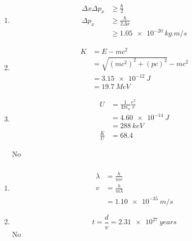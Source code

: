 \documentclass{article}
\begin{document}
\begin{enumerate}
  \item

        \begin{align*}
          \Delta x \Delta p_x & \ge \frac{\hbar}{2}          \\
          \Delta p_x          & \ge \frac{\hbar}{2 \Delta x} \\
                              & \ge \qty{1.05e-20}{kg.m/s}
        \end{align*}

  \item

        \begin{align*}
          K & = E - m c^2                          \\
            & = \sqrt{(m c^2)^2 + (p c)^2} - m c^2 \\
            & = \qty{3.15e-12}{J}                  \\
            & = \qty{19.7}{MeV}
        \end{align*}

  \item

        \begin{align*}
          U           & = \frac{1}{4 \pi \epsilon_0} \frac{e^2}{r} \\
                      & = \qty{4.60e-14}{J}                        \\
                      & = \qty{288}{keV}                           \\
          \frac{K}{U} & = 68.4
        \end{align*}

        No
\end{enumerate}

\setcounter{subsubsection}{74}
\subsubsection{}

\begin{enumerate}
  \item

        \begin{align*}
          \lambda & = \frac{h}{m v}       \\
          v       & = \frac{h}{m \lambda} \\
                  & = \qty{1.10e-35}{m/s}
        \end{align*}

  \item \[t = \frac{d}{v} = \qty{2.31e27}{years}\] No
\end{enumerate}
\end{document}
